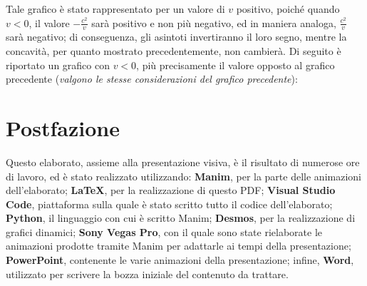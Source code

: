 \documentclass{article}
\begin{document}
Tale grafico è stato rappresentato per un valore di
\(v\) positivo, poiché quando \(v < 0\), il valore
\(- \frac{c^2}{v}\) sarà positivo e non più negativo,
ed in maniera analoga, \(\frac{c^2}{v}\) sarà negativo;
di conseguenza, gli asintoti invertiranno il loro segno,
mentre la concavità, per quanto mostrato precedentemente,
non cambierà. Di seguito è riportato un grafico con
\(v < 0\), più precisamente il valore opposto al grafico
precedente (\textit{valgono le stesse considerazioni del
grafico precedente}):

\begin{center}
\end{center}

\section{Postfazione}
Questo elaborato, assieme alla presentazione visiva, è il
risultato di numerose ore di lavoro, ed è stato realizzato
utilizzando: \textbf{Manim}, per la parte delle animazioni
dell'elaborato; \textbf{LaTeX}, per la realizzazione di questo
PDF; \textbf{Visual Studio Code}, piattaforma sulla quale
è stato scritto tutto il codice dell'elaborato; \textbf{Python},
il linguaggio con cui è scritto Manim; \textbf{Desmos}, per la
realizzazione di grafici dinamici; \textbf{Sony Vegas Pro},
con il quale sono state rielaborate le animazioni prodotte
tramite Manim per adattarle ai tempi della presentazione;
\textbf{PowerPoint}, contenente le varie animazioni della
presentazione; infine, \textbf{Word}, utilizzato per scrivere
la bozza iniziale del contenuto da trattare.\hfill\break
\end{document}
